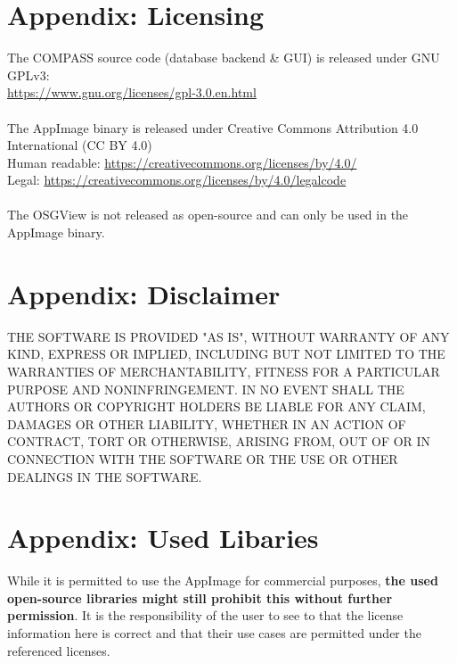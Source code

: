 \section{Appendix: Licensing}
\label{sec:appendix_licensing}

The COMPASS source code (database backend \& GUI) is released under GNU GPLv3: \\
\url{https://www.gnu.org/licenses/gpl-3.0.en.html} \\\\

The AppImage binary is released under Creative Commons Attribution 4.0 International (CC BY 4.0) \\
Human readable: \url{https://creativecommons.org/licenses/by/4.0/} \\
Legal: \url{https://creativecommons.org/licenses/by/4.0/legalcode} \\\\

The OSGView is not released as open-source and can only be used in the AppImage binary.

\section{Appendix: Disclaimer}

THE SOFTWARE IS PROVIDED "AS IS", WITHOUT WARRANTY OF ANY KIND, EXPRESS OR IMPLIED, INCLUDING BUT NOT LIMITED TO THE WARRANTIES OF MERCHANTABILITY, FITNESS FOR A PARTICULAR PURPOSE AND NONINFRINGEMENT. IN NO EVENT SHALL THE AUTHORS OR COPYRIGHT HOLDERS BE LIABLE FOR ANY CLAIM, DAMAGES OR OTHER LIABILITY, WHETHER IN AN ACTION OF CONTRACT, TORT OR OTHERWISE, ARISING FROM, OUT OF OR IN CONNECTION WITH THE SOFTWARE OR THE USE OR OTHER DEALINGS IN THE SOFTWARE.

\section{Appendix: Used Libaries}

While it is permitted to use the AppImage for commercial purposes, \textbf{the used open-source libraries might still prohibit this without further permission}. It is the responsibility of the user to see to that the license information here is correct and that their use cases are permitted under the referenced licenses.

